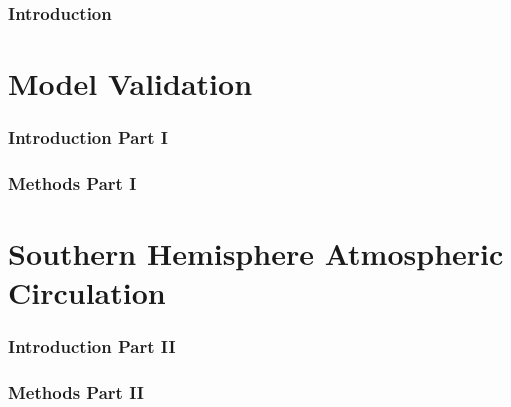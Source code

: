 \documentclass[12pt]{article}
\begin{document}


\section{Introduction}

\newpage

\part{Model Validation}
\section{Introduction Part I}

\newpage

\section{Methods Part I}

\newpage

\part{Southern Hemisphere Atmospheric Circulation}
\section{Introduction Part II}

\newpage

\section{Methods Part II}


% 
% 
% 

% 

% 
\end{document}
